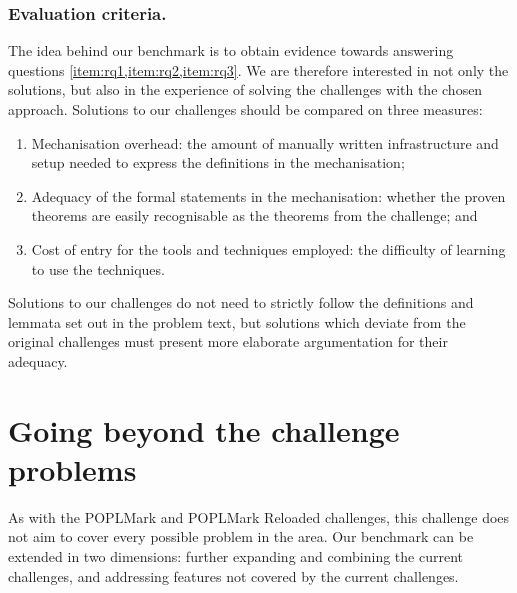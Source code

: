 \documentclass[runningheads]{llncs}
\begin{document}
\subsubsection{Evaluation criteria.}
The idea behind our benchmark is to obtain evidence towards answering questions \cref{item:rq1,item:rq2,item:rq3}. We are therefore interested in not only the solutions, but also in the experience of solving the challenges with the chosen approach.
Solutions to our challenges should be compared on three measures:
\begin{enumerate}
\item Mechanisation overhead: the amount of manually written infrastructure and setup needed to express the definitions in the mechanisation;
\item Adequacy of the formal statements in the mechanisation: whether the proven theorems are easily recognisable as the theorems from the challenge; and
\item Cost of entry for the tools and techniques employed: the difficulty of learning to use the techniques.
\end{enumerate}
Solutions to our challenges do not need to strictly follow the definitions and lemmata set out in the problem text, but solutions which deviate from the original challenges must present more elaborate argumentation for their adequacy.

\section{Going beyond the challenge problems}\label{sec:going-beyond}

As with the POPLMark and POPLMark Reloaded challenges, this challenge does not aim to cover every possible
problem in the area. Our benchmark can be extended in two
dimensions: further expanding and combining the current challenges,
and addressing features not covered by the current challenges.

\vspace{-1mm}%
\end{document}

